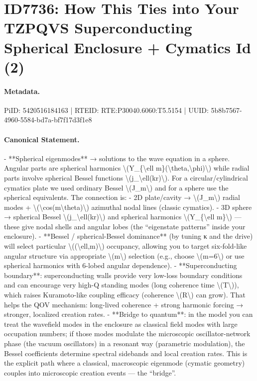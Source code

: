 \section*{ID7736: How This Ties into Your TZPQVS Superconducting Spherical Enclosure + Cymatics Id (2)}
\paragraph{Metadata.}
PiID: 5420516184163 | RTEID: RTE:P30040.6060:T5.5154 | UUID: 5b8b7567-4960-5584-bd7a-bf7f17d3f1e8

\paragraph{Canonical Statement.}
- **Spherical eigenmodes** → solutions to the wave equation in a sphere. Angular parts are spherical harmonics \textbackslash{}(Y\_\{\textbackslash{}ell m\}(\textbackslash{}theta,\textbackslash{}phi)\textbackslash{}) while radial parts involve spherical Bessel functions \textbackslash{}(j\_\textbackslash{}ell(kr)\textbackslash{}). For a circular/cylindrical cymatics plate we used ordinary Bessel \textbackslash{}(J\_m\textbackslash{}) and for a sphere use the spherical equivalents. The connection is: - 2D plate/cavity → \textbackslash{}(J\_m\textbackslash{}) radial modes + \textbackslash{}(\textbackslash{}cos(m\textbackslash{}theta)\textbackslash{}) azimuthal nodal lines (classic cymatics). - 3D sphere → spherical Bessel \textbackslash{}(j\_\textbackslash{}ell(kr)\textbackslash{}) and spherical harmonics \textbackslash{}(Y\_\{\textbackslash{}ell m\}\textbackslash{}) — these give nodal shells and angular lobes (the “eigenstate patterns” inside your enclosure). - **Bessel / spherical-Bessel dominance** (by tuning κ and the drive) will select particular \textbackslash{}((\textbackslash{}ell,m)\textbackslash{}) occupancy, allowing you to target six-fold-like angular structure via appropriate \textbackslash{}(m\textbackslash{}) selection (e.g., choose \textbackslash{}(m=6\textbackslash{}) or use spherical harmonics with 6-lobed angular dependence). - **Superconducting boundary**: superconducting walls provide very low-loss boundary conditions and can encourage very high-Q standing modes (long coherence time \textbackslash{}(T\textbackslash{})), which raises Kuramoto-like coupling efficacy (coherence \textbackslash{}(R\textbackslash{}) can grow). That helps the QOV mechanism: long-lived coherence + strong harmonic forcing → stronger, localized creation rates. - **Bridge to quantum**: in the model you can treat the wavefield modes in the enclosure as classical field modes with large occupation numbers; if those modes modulate the microscopic oscillator-network phase (the vacuum oscillators) in a resonant way (parametric modulation), the Bessel coefficients determine spectral sidebands and local creation rates. This is the explicit path where a classical, macroscopic eigenmode (cymatic geometry) couples into microscopic creation events — the “bridge”.

